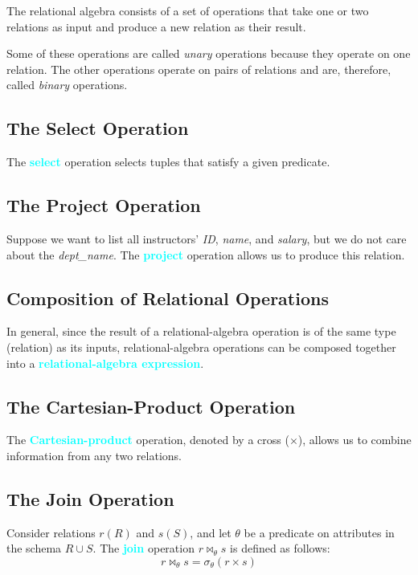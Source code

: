 \documentclass{Beautybook-EN}
\newcommand{\textcy}[1]{\textbf{\textcolor{cyan}{#1}}}
\begin{document}
The relational algebra consists of a set of operations that take one or two relations as input and produce a new relation as their result.

Some of these operations are called \textit{unary} operations because they operate on one relation. The other operations operate on pairs of relations and are, therefore, called \textit{binary} operations.

\subsection{The Select Operation}

The \textcy{select} operation selects tuples that satisfy a given predicate.

\subsection{The Project Operation}

Suppose we want to list all instructors' \textit{ID}, \textit{name}, and \textit{salary}, but we do not care about the \textit{dept\_name}. The \textcy{project} operation allows us to produce this relation.

\subsection{Composition of Relational Operations}

In general, since the result of a relational-algebra operation is of the same type (relation) as its inputs, relational-algebra operations can be composed together into a \textcy{relational-algebra expression}.

\subsection{The Cartesian-Product Operation}

The \textcy{Cartesian-product} operation, denoted by a cross ($\times$), allows us to combine information from any two relations.

\subsection{The Join Operation}

Consider relations $r(R)$ and $s(S)$, and let $\theta$ be a predicate on attributes in the schema $R\cup S$. The \textcy{join} operation $r\Join_{\theta}s$ is defined as follows: $$r\Join_{\theta}s=\sigma_{\theta}(r\times s)$$
\end{document}
